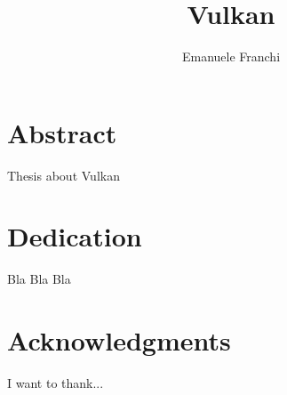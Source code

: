 \documentclass[a4paper]{report}
\author{Emanuele Franchi}
\title{Vulkan}
\begin{document}
\maketitle

\chapter*{Abstract}
Thesis about Vulkan

\chapter*{Dedication}
Bla Bla Bla

\chapter*{Acknowledgments}
I want to thank...

\tableofcontents
\listoffigures
\lstlistoflistings
















\appendix




\nocite{*}

\end{document}
